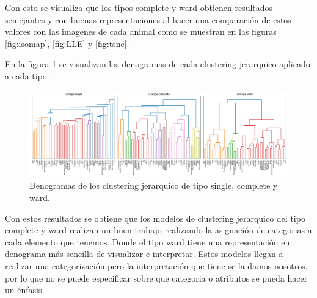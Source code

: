 Con esto se visualiza que los tipos complete y ward obtienen resultados semejantes y con buenas representaciones al hacer una comparación de estos valores con las imagenes de cada animal como se muestran en las figuras \ref{fig:isomap}, \ref{fig:LLE} y \ref{fig:tsne}.


En la figura \ref{fig:denograms} se visualizan los denogramas de cada clustering jerarquico aplicado a cada tipo.

\begin{figure}[H]
    \centering
    \includegraphics[width=17cm]{Graphics/denograms.png}
    \caption{Denogramas de los clustering jerarquico de tipo single, complete y ward.}
    \label{fig:denograms}
\end{figure}


Con estos resultados se obtiene que los modelos de clustering jerarquico del tipo complete y ward realizan un buen trabajo realizando la asignación de categorias a cada elemento que tenemos. Donde el tipo ward tiene una representación en denograma más sencilla de visualizar e interpretar. Estos modelos llegan a realizar una categorización pero la interpretación que tiene se la damos nosotros, por lo que no se puede especificar sobre que categoria o atributos se pueda hacer un énfasis.